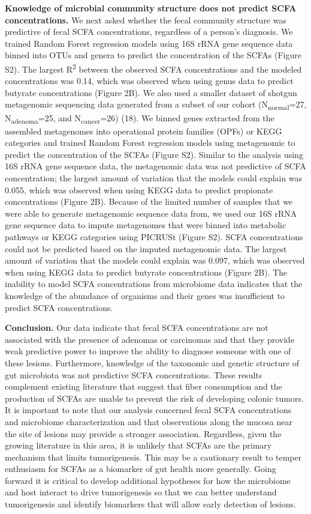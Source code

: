 \documentclass[11pt,]{article}
\begin{document}
\textbf{Knowledge of microbial community structure does not predict SCFA
concentrations.} We next asked whether the fecal community structure was
predictive of fecal SCFA concentrations, regardless of a person's
diagnosis. We trained Random Forest regression models using 16S rRNA
gene sequence data binned into OTUs and genera to predict the
concentration of the SCFAs (Figure S2). The largest R\textsuperscript{2}
between the observed SCFA concentrations and the modeled concentrations
was 0.14, which was observed when using genus data to predict butyrate
concentrations (Figure 2B). We also used a smaller dataset of shotgun
metagenomic sequencing data generated from a subset of our cohort
(N\textsubscript{normal}=27, N\textsubscript{adenoma}=25, and
N\textsubscript{cancer}=26) (18). We binned genes extracted from the
assembled metagenomes into operational protein families (OPFs) or KEGG
categories and trained Random Forest regression models using metagenomic
to predict the concentration of the SCFAs (Figure S2). Similar to the
analysis using 16S rRNA gene sequence data, the metagenomic data was not
predictive of SCFA concentration; the largest amount of variation that
the models could explain was 0.055, which was observed when using KEGG
data to predict propionate concentrations (Figure 2B). Because of the
limited number of samples that we were able to generate metagenomic
sequence data from, we used our 16S rRNA gene sequence data to impute
metagenomes that were binned into metabolic pathways or KEGG categories
using PICRUSt (Figure S2). SCFA concentrations could not be predicted
based on the imputed metagenomic data. The largest amount of variation
that the models could explain was 0.097, which was observed when using
KEGG data to predict butyrate concentrations (Figure 2B). The inability
to model SCFA concentrations from microbiome data indicates that the
knowledge of the abundance of organisms and their genes was insufficient
to predict SCFA concentrations.

\textbf{Conclusion.} Our data indicate that fecal SCFA concentrations
are not associated with the presence of adenomas or carcinomas and that
they provide weak predictive power to improve the ability to diagnose
someone with one of these lesions. Furthermore, knowledge of the
taxonomic and genetic structure of gut microbiota was not predictive
SCFA concentrations. These results complement existing literature that
suggest that fiber consumption and the production of SCFAs are unable to
prevent the risk of developing colonic tumors. It is important to note
that our analysis concerned fecal SCFA concentrations and microbiome
characterization and that observations along the mucosa near the site of
lesions may provide a stronger association. Regardless, given the
growing literature in this area, it is unlikely that SCFAs are the
primary mechanism that limits tumorigenesis. This may be a cautionary
result to temper enthusiasm for SCFAs as a biomarker of gut health more
generally. Going forward it is critical to develop additional hypotheses
for how the microbiome and host interact to drive tumorigenesis so that
we can better understand tumorigenesis and identify biomarkers that will
allow early detection of lesions.
\end{document}
